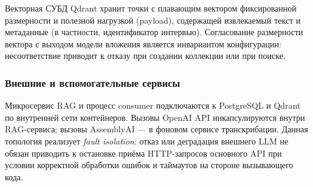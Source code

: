 \documentclass{article}
\begin{document}
Векторная СУБД Qdrant хранит точки с плавающим вектором фиксированной размерности и полезной нагрузкой (payload), содержащей извлекаемый текст и метаданные (в частности, идентификатор интервью). Согласование размерности вектора с выходом модели вложения является инвариантом конфигурации: несоответствие приводит к отказу при создании коллекции или при поиске.

\subsubsection{Внешние и вспомогательные сервисы}

Микросервис RAG и процесс consumer подключаются к PostgreSQL и Qdrant по внутренней сети контейнеров. Вызовы OpenAI API инкапсулируются внутри RAG-сервиса; вызовы AssemblyAI --- в фоновом сервисе транскрибации. Данная топология реализует \emph{fault isolation}: отказ или деградация внешнего LLM не обязан приводить к остановке приёма HTTP-запросов основного API при условии корректной обработки ошибок и таймаутов на стороне вызывающего кода.
\end{document}
